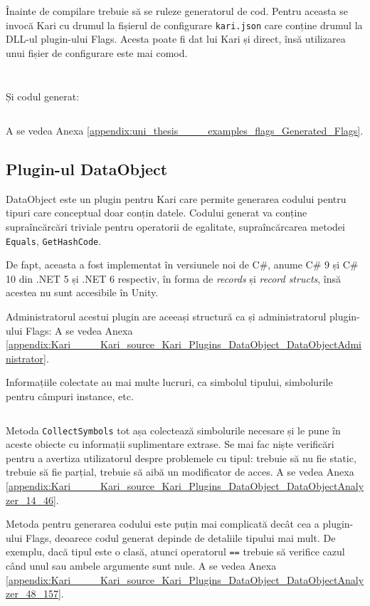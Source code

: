 \documentclass[a4paper,12pt]{report}
\begin{document}
Înainte de compilare trebuie să se ruleze generatorul de cod.
Pentru aceasta se invocă Kari cu drumul la fișierul de configurare \texttt{kari.json} care conține drumul la \ac{DLL}-ul plugin-ului Flags.
Acesta poate fi dat lui Kari și direct, însă utilizarea unui fișier de configurare este mai comod.
\inputminted{bat}{../examples/flags/kari.bat}
\inputminted{js}{../examples/flags/kari.json}


Și codul generat:
\inputminted{cs}{../examples/flags/Generated/FlagsAnnotations.cs}
A se vedea Anexa \ref{appendix:uni_thesis____examples_flags_Generated_Flags}.

\subsection{Plugin-ul DataObject}

DataObject este un plugin pentru Kari care permite generarea codului pentru tipuri care conceptual doar conțin datele.
Codului generat va conține supraîncărcări triviale pentru operatorii de egalitate, supraîncărcarea metodei \texttt{Equals}, \texttt{GetHashCode}.

De fapt, aceasta a fost implementat în versiunele noi de C\#, anume C\# 9 și C\# 10 din {{.}NET} 5 și {{.}NET} 6 respectiv, în forma de \emph{records} și \emph{record structs}, însă acestea nu sunt accesibile în Unity.\cite{records_in_csharp}

Administratorul acestui plugin are aceeași structură ca și administratorul plugin-ului Flags:
A se vedea Anexa \ref{appendix:Kari____Kari_source_Kari_Plugins_DataObject_DataObjectAdministrator}.

Informațiile colectate au mai multe lucruri, ca simbolul tipului, simbolurile pentru câmpuri instance, etc.
\inputminted[firstline=160, lastline=180]{cs}{../Kari/source/Kari.Plugins/DataObject/DataObjectAnalyzer.cs}

Metoda \texttt{CollectSymbols} tot așa colectează simbolurile necesare și le pune în aceste obiecte cu informații suplimentare extrase.
Se mai fac niște verificări pentru a avertiza utilizatorul despre problemele cu tipul: trebuie să nu fie static, trebuie să fie parțial, trebuie să aibă un modificator de acces.
A se vedea Anexa \ref{appendix:Kari____Kari_source_Kari_Plugins_DataObject_DataObjectAnalyzer_14_46}.

Metoda pentru generarea codului este puțin mai complicată decât cea a plugin-ului Flags, deoarece codul generat depinde de detaliile tipului mai mult.
De exemplu, dacă tipul este o clasă, atunci operatorul \texttt{==} trebuie să verifice cazul când unul sau ambele argumente sunt nule.
A se vedea Anexa \ref{appendix:Kari____Kari_source_Kari_Plugins_DataObject_DataObjectAnalyzer_48_157}.
\end{document}
